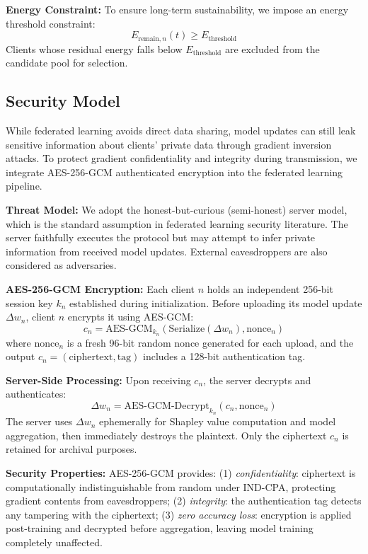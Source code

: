 \textbf{Energy Constraint:} To ensure long-term sustainability, we impose an energy threshold constraint:
\begin{equation}
E_{\text{remain},n}(t) \geq E_{\text{threshold}}
\end{equation}
Clients whose residual energy falls below $E_{\text{threshold}}$ are excluded from the candidate pool for selection.

\subsection{Security Model}

While federated learning avoids direct data sharing, model updates can still leak sensitive information about clients' private data through gradient inversion attacks. To protect gradient confidentiality and integrity during transmission, we integrate AES-256-GCM authenticated encryption into the federated learning pipeline.

\textbf{Threat Model:} We adopt the honest-but-curious (semi-honest) server model, which is the standard assumption in federated learning security literature. The server faithfully executes the protocol but may attempt to infer private information from received model updates. External eavesdroppers are also considered as adversaries.

\textbf{AES-256-GCM Encryption:} Each client $n$ holds an independent 256-bit session key $k_n$ established during initialization. Before uploading its model update $\Delta w_n$, client $n$ encrypts it using AES-GCM:
\begin{equation}
c_n = \text{AES-GCM}_{k_n}(\text{Serialize}(\Delta w_n), \text{nonce}_n)
\end{equation}
where $\text{nonce}_n$ is a fresh 96-bit random nonce generated for each upload, and the output $c_n = (\text{ciphertext}, \text{tag})$ includes a 128-bit authentication tag.

\textbf{Server-Side Processing:} Upon receiving $c_n$, the server decrypts and authenticates:
\begin{equation}
\Delta w_n = \text{AES-GCM-Decrypt}_{k_n}(c_n, \text{nonce}_n)
\end{equation}
The server uses $\Delta w_n$ ephemerally for Shapley value computation and model aggregation, then immediately destroys the plaintext. Only the ciphertext $c_n$ is retained for archival purposes.

\textbf{Security Properties:} AES-256-GCM provides: (1) \textit{confidentiality}: ciphertext is computationally indistinguishable from random under IND-CPA, protecting gradient contents from eavesdroppers; (2) \textit{integrity}: the authentication tag detects any tampering with the ciphertext; (3) \textit{zero accuracy loss}: encryption is applied post-training and decrypted before aggregation, leaving model training completely unaffected.

